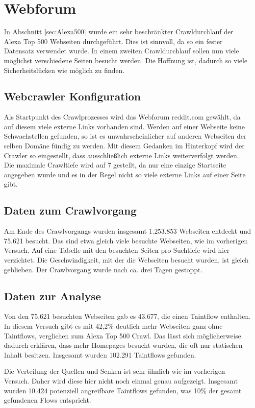 \section{Webforum}
In Abschnitt \ref{sec:Alexa500} wurde ein sehr beschränkter Crawldurchlauf der Alexa Top 500 Webseiten durchgeführt. Dies ist sinnvoll, da so ein fester Datensatz verwendet wurde. In einem zweiten Crawldurchlauf sollen nun viele möglichst verschiedene Seiten besucht werden. Die Hoffnung ist, dadurch so viele Sicherheitslücken wie möglich zu finden.
\subsection{Webcrawler Konfiguration}
Als Startpunkt des Crawlprozesses wird das Webforum reddit.com gewählt, da auf diesem viele externe Links vorhanden sind. Werden auf einer Webseite keine Schwachstellen gefunden, so ist es unwahrscheinlicher auf anderen Webseiten der selben Domäne fündig zu werden. Mit diesem Gedanken im Hinterkopf wird der Crawler so eingestellt, dass ausschließlich externe Links weiterverfolgt werden. \\
Die maximale Crawltiefe wird auf 7 gestellt, da nur eine einzige Startseite angegeben wurde und es in der Regel nicht so viele externe Links auf einer Seite gibt.
\subsection{Daten zum Crawlvorgang}
Am Ende des Crawlvorgangs wurden insgesamt 1.253.853 Webseiten entdeckt und 75.621 besucht. Das sind etwa gleich viele besuchte Webseiten, wie im vorherigen Versuch. Auf eine Tabelle mit den besuchten Seiten pro Suchtiefe wird hier verzichtet. Die Geschwindigkeit, mit der die Webseiten besucht wurden, ist gleich geblieben. Der Crawlvorgang wurde nach ca. drei Tagen gestoppt.
\subsection{Daten zur Analyse}
Von den 75.621 besuchten Webseiten gab es 43.677, die einen Taintflow enthalten. In diesem Versuch gibt es mit  42,2\% deutlich mehr Webseiten ganz ohne Taintflows, verglichen zum Alexa Top 500 Crawl. Das lässt sich möglicherweise dadurch erklären, dass mehr Homepages besucht wurden, die oft nur statischen Inhalt besitzen. Insgesamt wurden 102.291 Taintflows gefunden.

Die Verteilung der Quellen und Senken ist sehr ähnlich wie im vorherigen Versuch. Daher wird diese hier nicht noch einmal genau aufgezeigt. Insgesamt wurden 10.424 potenziell angreifbare Taintflows gefunden, was 10\% der gesamt gefundenen Flows entspricht.

